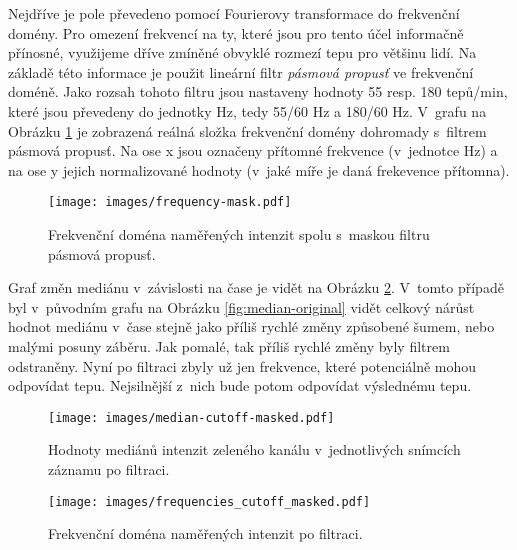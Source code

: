 \documentclass[
  digital, %
  table,   %
%
  lof,     %
  lot,     %
]{fithesis3}
\begin{document}
Nejdříve je pole převedeno pomocí Fourierovy transformace do frekvenční domény. Pro omezení frekvencí na ty, které jsou pro tento účel informačně přínosné, využijeme dříve zmíněné obvyklé rozmezí tepu pro většinu lidí. Na základě této informace je použit lineární filtr \emph{pásmová propusť} ve frekvenční doméně. Jako rozsah tohoto filtru jsou nastaveny hodnoty 55 resp. 180 tepů/min, které jsou převedeny do jednotky Hz, tedy 55/60 Hz a 180/60 Hz. V~grafu na Obrázku \ref{fig:frequency-mask} je zobrazená reálná složka frekvenční domény dohromady s~filtrem pásmová propusť. Na ose x jsou označeny přítomné frekvence (v~jednotce Hz) a na ose y jejich normalizované hodnoty (v~jaké míře je daná frekevence přítomna). 

\begin{figure}
  \begin{center}
    \texttt{[image: images/frequency-mask.pdf]}
  \end{center}
  \caption{Frekvenční doména naměřených intenzit spolu s~maskou filtru pásmová propusť.}
  \label{fig:frequency-mask}
\end{figure}

Graf změn mediánu v~závislosti na čase je vidět na Obrázku \ref{fig:median-cutoff-masked}.  V~tomto případě byl v~původním grafu na Obrázku \ref{fig:median-original} vidět celkový nárůst hodnot mediánu v~čase stejně jako příliš rychlé změny způsobené šumem, nebo malými posuny záběru. Jak pomalé, tak příliš rychlé změny byly filtrem odstraněny. Nyní po filtraci zbyly už jen frekvence, které potenciálně mohou odpovídat tepu. Nejsilnější z~nich bude potom odpovídat výslednému tepu.

\begin{figure}
  \begin{center}
    \texttt{[image: images/median-cutoff-masked.pdf]}
  \end{center}
  \caption{Hodnoty mediánů intenzit zeleného kanálu v~jednotlivých snímcích záznamu po filtraci.}
  \label{fig:median-cutoff-masked}
\end{figure}

\begin{figure}
  \begin{center}
    \texttt{[image: images/frequencies\_cutoff\_masked.pdf]}
  \end{center}
  \caption{Frekvenční doména naměřených intenzit po filtraci.}
  \label{fig:frequencies-cutoff-masked}
\end{figure}
\end{document}

